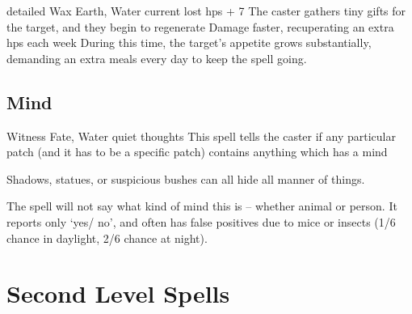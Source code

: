 \begin{multicols}{2}

  {detailed}%
  {Wax}%
  {Earth, Water}%
  {current lost \glspl{hp} + 7}%
  {The caster gathers tiny gifts for the target, and they begin to regenerate Damage faster, recuperating an extra  \glspl{hp} each week}%
  {During this time, the target's appetite grows substantially, demanding an extra  meals every day to keep the spell going.}

\subsection{Mind}


  {}%
  {Witness}%
  {Fate, Water}%
  {quiet thoughts}%
  {This spell tells the caster if any particular patch (and it has to be a specific patch) contains anything which has a mind}%
  {Shadows, statues, or suspicious bushes can all hide all manner of things.

    The spell will not say what kind of mind this is -- whether animal or person.
    It reports only `yes/ no', and often has false positives due to mice or insects (1/6 chance in daylight, 2/6 chance at night).}

\end{multicols}

\section{Second Level Spells}

